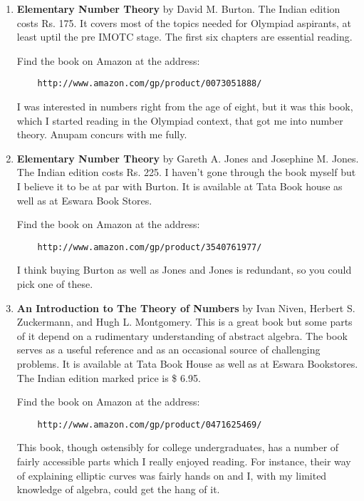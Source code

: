 \documentclass[a4paper]{amsart}
\begin{document}
\begin{enumerate}

\item {\bf Elementary Number Theory} by David M. Burton. The Indian edition costs Rs. 175. It covers most of the topics needed for
  Olympiad aspirants, at least uptil the pre IMOTC stage. The first six chapters are essential reading.

  Find the book on Amazon at the address:

  \begin{verbatim}
    http://www.amazon.com/gp/product/0073051888/
  \end{verbatim}

  I was interested in numbers right from the age of eight, but it was this book, which I started reading in the Olympiad context,
  that got me into number theory. Anupam concurs with me fully.

\item {\bf Elementary Number Theory} by Gareth A. Jones and Josephine M. Jones. The Indian edition costs Rs. 225. I haven't gone through
  the book myself but I believe it to be at par with Burton. It is available at Tata Book house as well as at Eswara Book Stores.

  Find the book on Amazon at the address:

  \begin{verbatim}
    http://www.amazon.com/gp/product/3540761977/
  \end{verbatim}

  I think buying Burton as well as Jones and Jones is redundant, so you could pick one of these.

\item {\bf An Introduction to The Theory of Numbers} by Ivan Niven, Herbert S. Zuckermann, and Hugh L. Montgomery. This is a great
  book but some parts of it depend on a rudimentary 
  understanding of abstract algebra. The book serves as a useful reference and as an
  occasional source of challenging problems. It is available at Tata Book House as well as at Eswara Bookstores.
  The Indian edition marked price is \$ 6.95.

  Find the book on Amazon at the address:

  \begin{verbatim}
    http://www.amazon.com/gp/product/0471625469/
  \end{verbatim}

  This book, though ostensibly for college undergraduates, has a number of fairly accessible parts which I really enjoyed reading.
  For instance, their way of explaining elliptic curves was fairly hands on and I, with my limited knowledge of algebra, could get the hang
  of it.


\end{enumerate}
\end{document}
